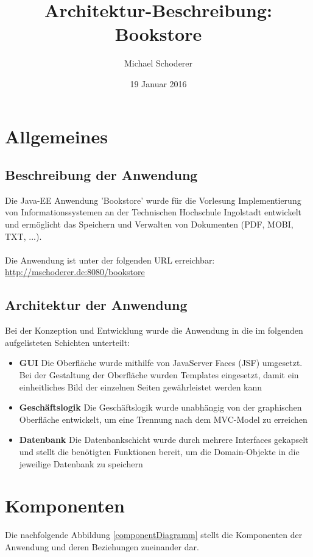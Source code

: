 \documentclass[12pt,a4paper]{book}
\author{Michael Schoderer}
\title{Architektur-Beschreibung: Bookstore}
\date{19 Januar 2016}
\begin{document}
	\maketitle	
	\begin{minipage}{\textwidth}
		\vfill
		\tableofcontents
			\listoffigures
	\end{minipage}

	
	
	
	\chapter{Allgemeines}
	\section{Beschreibung der Anwendung}
	Die Java-EE Anwendung 'Bookstore' wurde für die Vorlesung Implementierung von Informationssystemen an der Technischen Hochschule Ingolstadt entwickelt und ermöglicht das Speichern und Verwalten von Dokumenten (PDF, MOBI, TXT, ...).\\
	\\
	Die Anwendung ist unter der folgenden URL erreichbar: \url{http://mschoderer.de:8080/bookstore}
	
	\section{Architektur der Anwendung}
	Bei der Konzeption und Entwicklung wurde die Anwendung in die im folgenden aufgelisteten Schichten unterteilt:
	\begin{itemize}
		\item \textbf{GUI} Die Oberfläche wurde mithilfe von JavaServer Faces (JSF) umgesetzt. Bei der Gestaltung der Oberfläche wurden Templates eingesetzt, damit ein einheitliches Bild der einzelnen Seiten gewährleistet werden kann
		\item \textbf{Geschäftslogik} Die Geschäftslogik wurde unabhängig von der graphischen Oberfläche entwickelt, um eine Trennung nach dem MVC-Model zu erreichen
		\item \textbf{Datenbank} Die Datenbankschicht wurde durch mehrere Interfaces gekapselt und stellt die benötigten Funktionen bereit, um die Domain-Objekte in die jeweilige Datenbank zu speichern		
		\end{itemize}	
		
		\let\cleardoublepage\clearpage
	\chapter{Komponenten}
	Die nachfolgende Abbildung \ref{componentDiagramm} stellt die Komponenten der Anwendung und deren Beziehungen zueinander dar.
	
\end{document}
